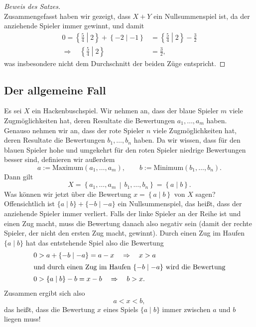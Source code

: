 \documentclass{zirkelbrief1516}
\begin{document}
\begin{proof}[Beweis des Satzes]
\smallskip \\
Zusammengefasst haben wir gezeigt, dass $X+Y$ ein Nullsummenspiel ist, da der anziehende Spieler immer gewinnt, und damit
\begin{align*}
  0= \left\{ \frac 54 \middle| 2 \right\} + \left\{ -2 \mid -1 \right\} &= \left\{ \frac 54 \middle| 2 \right\} - \frac 32 \\
  \Rightarrow\quad\left\{\frac{5}{4}\middle| 2\right\}& = \frac{3}{2},
\end{align*}
was insbesondere nicht dem Durchschnitt der beiden Züge entspricht.
\end{proof}

\subsection*{Der allgemeine Fall}

Es sei $X$ ein Hackenbuschspiel. Wir nehmen an, dass der blaue Spieler $m$ viele Zug\-m\"og\-lich\-kei\-ten hat, deren Resultate die Bewertungen $a_1,\ldots,a_m$ haben. Genauso nehmen wir an, dass der rote Spieler $n$ viele Zugm\"oglichkeiten hat, deren Resultate die Bewertungen $b_1,\ldots,b_n$ haben. Da wir wissen, dass f\"ur den blauen Spieler hohe und umgekehrt f\"ur den roten Spieler niedrige Bewertungen besser sind, definieren wir au\ss erdem
\[ a:=\text{Maximum}\left( a_1,\ldots,a_m\right), \quad \quad b:=\text{Minimum}\left( b_1,\ldots,b_n\right). \]
Dann gilt
\[ X = \left\{ a_1,\ldots,a_m \,\middle|\, b_1,\ldots,b_n \right\} = \left\{ a \mid b \right\}. \]
Was k\"onnen wir jetzt \"uber die Bewertung $x=\left\{ a \mid b\right\}$ von $X$ sagen? Offensichtlich ist $\{a \mid b \} + \{ -b \mid -a \}$ ein Nullsummenspiel, das hei\ss t, dass der anziehende Spieler immer verliert. Falls der linke Spieler an der Reihe ist und einen Zug macht, muss die Bewertung danach also negativ sein (damit der rechte Spieler, der nicht den ersten Zug macht, gewinnt). Durch einen Zug im Haufen $\{a\mid b \}$ hat das entstehende Spiel also die Bewertung
\begin{align*}
  0&>a + \left\{ -b \mid -a \right\} = a-x \quad \Rightarrow \quad x>a \\
  \intertext{und durch einen Zug im Haufen $\{-b \mid -a \}$ wird die Bewertung}
  0&>\left\{ a \mid b \right\} - b = x -b \quad \Rightarrow \quad b>x.
\end{align*}
Zusammen ergibt sich also
\[ a<x<b, \]
das hei\ss t, dass die Bewertung $x$ eines Spiels $\{a \mid b \}$ immer zwischen $a$ und $b$ liegen muss!
\end{document}

